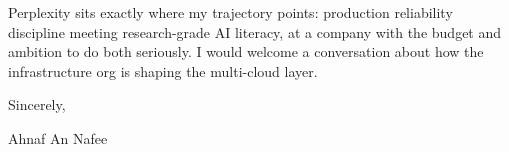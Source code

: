 \documentclass[letterpaper,11pt]{article}
\begin{document}
Perplexity sits exactly where my trajectory points: production reliability discipline meeting research-grade AI literacy, at a company with the budget and ambition to do both seriously. I would welcome a conversation about how the infrastructure org is shaping the multi-cloud layer.

Sincerely,

\vspace{18pt}
Ahnaf An Nafee
\end{document}

